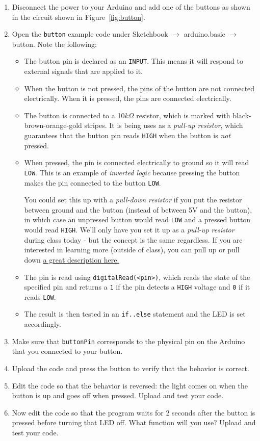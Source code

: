 \documentclass[11pt]{article} %
\begin{document}
\begin{enumerate}
\item Disconnect the power to your Arduino and add one of the buttons as shown in the circuit shown in Figure~\ref{fig:button}.
\item Open the \verb|button| example code under Sketchbook $\rightarrow$ arduino.basic $\rightarrow$ button. Note the following:
\begin{itemize}
\item The button pin is declared as an \verb|INPUT|. This means it will respond to external signals that are applied to it.
\item When the button is not pressed, the  pins of the button are not connected electrically.  When it is pressed, the pins are connected electrically.
\item The button is connected to a 10$k\Omega$ resistor, which is marked with black-brown-orange-gold stripes. It is being uses as a \emph{pull-up resistor}, which guarantees that the button pin reads \verb|HIGH| when the button is \emph{not} pressed.
\item When pressed, the pin is connected electrically to ground so it will read \verb|LOW|. This is an example of \emph{inverted logic} because pressing the button makes the pin connected to the button \verb|LOW|. 

You could set this up with a \emph{pull-down resistor} if you put the resistor between ground and the button (instead of between 5V and the button), in which case an unpressed button would read \verb|LOW| and a pressed button would read \verb|HIGH|.  We'll only have you set it up as a \emph{pull-up resistor} during class today - but the concept is the same regardless.  If you are interested in learning more (outside of class), you can pull up or pull down \href{https://learn.sparkfun.com/tutorials/pull-up-resistors}{\underline{a great description here.}}
\item The pin is read using \verb|digitalRead(<pin>)|, which reads the state of the specified pin and returns a \verb|1| if the pin detects a \verb|HIGH| voltage and \verb|0| if it reads \verb|LOW|.
\item The result is then tested in an \verb|if..else| statement and the LED is set accordingly.
\end{itemize}
\item Make sure that \verb|buttonPin| corresponds to the physical pin on the Arduino that you connected to your button.
\item Upload the code and press the button to verify that the behavior is correct.
\item Edit the code so that the behavior is reversed: the light comes on when the button is up and goes off when pressed. Upload and test your code.
\item Now edit the code so that the program waits for 2 seconds after the button is pressed before turning that LED off. What function will you use? Upload and test your code.
\end{enumerate}
\end{document}
